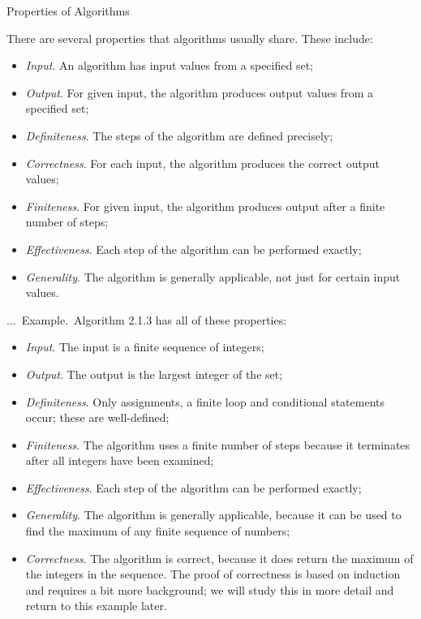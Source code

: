\documentclass[smaller,hyperref={CJKbookmarks=true}]{beamer}
\newcounter{zhuo}[subsection]
\renewcommand{\thezhuo}{\thesection.\thesubsection.\arabic{zhuo}}
\newenvironment{EXAMPLE}{\stepcounter{zhuo}\alert{\!\thezhuo.~Example.\,}}{}
\begin{document}
\begin{frame}{Properties of Algorithms}
\begin{spacing}{1.1}
There are several properties that algorithms usually share. These include:
\begin{itemize}
  \item \emph{Input}. An algorithm has input values from a specified set;
  \item \emph{Output}. For given input, the algorithm produces output values from a specified set;
  \item \emph{Definiteness}. The steps of the algorithm are defined precisely;
  \item \emph{Correctness}. For each input, the algorithm produces the correct output values;
  \item \emph{Finiteness}. For given input, the algorithm produces output after a finite number of steps;
  \item \emph{Effectiveness}. Each step of the algorithm can be performed exactly;
  \item \emph{Generality}. The algorithm is generally applicable, not just for certain input values.
\end{itemize}
\newpage
\begin{EXAMPLE}
Algorithm 2.1.3 has all of these properties:
\begin{itemize}
  \item \emph{Input}. The input is a finite sequence of integers;
  \item \emph{Output}. The output is the largest integer of the set;
  \item \emph{Definiteness}. Only assignments, a finite loop and conditional statements occur; these are well-defined;
  \item \emph{Finiteness}. The algorithm uses a finite number of steps because it terminates after all integers have been examined;
  \item \emph{Effectiveness}. Each step of the algorithm can be performed exactly;
  \item \emph{Generality}. The algorithm is generally applicable, because it can be used to find the maximum of any finite sequence of numbers;
  \item \emph{Correctness}. The algorithm is correct, because it does return the maximum of the integers in the sequence. The proof of correctness is based on induction and requires a bit more background; we will study this in more detail and return to this example later.
\end{itemize}
\end{EXAMPLE}
\end{spacing}
\end{frame}
\end{document}
